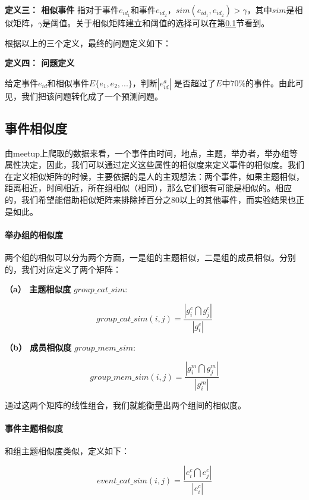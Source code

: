 \documentclass[12pt]{template}
\begin{document}
\textbf{定义三： 相似事件}
指对于事件\(e_{id_1}\)和事件\(e_{id_2}\)，\(sim(e_{id_1},e_{id_2})>\gamma\)，其中\(sim\)是相似矩阵，\(\gamma\)是阈值。关于相似矩阵建立和阈值的选择可以在第\ref{s1-4}节看到。

根据以上的三个定义，最终的问题定义如下：

\textbf{定义四： 问题定义}

给定事件\(e_{id}\)和相似事件\(E\{e_1,e_2,...\}\)，判断\(|e_{id}^a|\)
是否超过了\(E\)中70\%的事件。由此可见，我们把该问题转化成了一个预测问题。


\subsection{事件相似度}\label{s1-4}
由meetup上爬取的数据来看，一个事件由时间，地点，主题，举办者，举办组等属性决定，因此，我们可以通过定义这些属性的相似度来定义事件的相似度。我们在定义相似矩阵的时候，主要依据的是人的主观想法：两个事件，如果主题相似，距离相近，时间相近，所在组相似（相同），那么它们很有可能是相似的。相应的，我们希望能借助相似矩阵来排除掉百分之80以上的其他事件，而实验结果也正是如此。
\paragraph{举办组的相似度}
两个组的相似可以分为两个方面，一是组的主题相似，二是组的成员相似。分别的，我们对应定义了两个矩阵：

\textbf{（a） 主题相似度} \(group\_cat\_sim:\)

\begin{equation}
group\_cat\_sim(i,j)=\frac{|g_i^c\bigcap g_j^c|}{|g_i^c|}
\end{equation}


\textbf{（b） 成员相似度} \(group\_mem\_sim:\)

\begin{equation}
group\_mem\_sim(i,j)=\frac{|g_i^m\bigcap g_j^m|}{|g_i^m|}
\end{equation}

通过这两个矩阵的线性组合，我们就能衡量出两个组间的相似度。

\paragraph{事件主题相似度}

和组主题相似度类似，定义如下：

\begin{equation}
event\_cat\_sim(i,j)=\frac{|e_i^c\bigcap e_j^c|}{|e_i^c|}
\end{equation}
\end{document}
